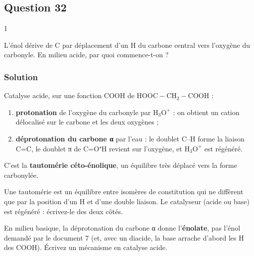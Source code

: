 \documentclass[11pt,a4paper]{article}
\providecommand{\tightlist}{\setlength{\itemsep}{0pt}\setlength{\parskip}{0pt}}
\newcommand{\equationajustee}[1]{%
  \sbox{\boiteequation}{$\displaystyle #1$}%
  \ifdim\wd\boiteequation>\linewidth
    \[\resizebox{\linewidth}{!}{\usebox{\boiteequation}}\]%
  \else
    \[#1\]%
  \fi}
\begin{document}
\hypertarget{question-32}{%
\subsection{Question 32}\label{question-32}}

\begin{indication}{1}

L'énol dérive de C par déplacement d'un H du carbone central vers l'oxygène du carbonyle. En milieu acide, par quoi commence-t-on ?

\end{indication}

\hypertarget{solution-31}{%
\subsubsection{Solution}\label{solution-31}}

Catalyse acide, sur une fonction COOH de \(\mathrm{HOOC{-}CH_2{-}COOH}\) :

\begin{enumerate}
\def\labelenumi{\arabic{enumi}.}
\tightlist
\item
  \textbf{protonation} de l'oxygène du carbonyle par \(\mathrm{H_3O^+}\) : on obtient un cation délocalisé sur le carbone et les deux oxygènes ;
\item
  \textbf{déprotonation du carbone α} par l'eau : le doublet C--H forme la liaison C=C, le doublet π de C=O⁺H revient sur l'oxygène, et \(\mathrm{H_3O^+}\) est régénéré.
\end{enumerate}

\equationajustee{\mathrm{HOOC{-}CH_2{-}C(=O)OH}\ \rightleftharpoons\ \mathrm{HOOC{-}CH{=}C(OH)_2}}

C'est la \textbf{tautomérie céto-énolique}, un équilibre très déplacé vers la forme carbonylée.

\begin{methode}

Une tautomérie est un équilibre entre isomères de constitution qui ne diffèrent que par la position d'un H et d'une double liaison. Le catalyseur (acide ou base) est régénéré : écrivez-le des deux côtés.

\end{methode}

\begin{piege}

En milieu basique, la déprotonation du carbone α donne l'\textbf{énolate}, pas l'énol demandé par le document 7 (et, avec un diacide, la base arrache d'abord les H des COOH). Écrivez un mécanisme en catalyse acide.

\end{piege}
\end{document}

